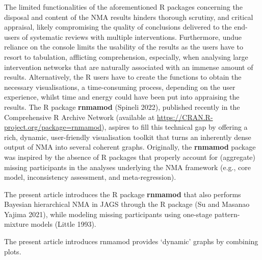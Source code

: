 The limited functionalities of the aforementioned R packages concerning the disposal
and content of the NMA results hinders thorough scrutiny, and critical appraisal,
likely compromising the quality of conclusions delivered to the end-users of
systematic reviews with multiple interventions. Furthermore, undue reliance on the
console limits the usability of the results as the users have to resort to tabulation,
afflicting comprehension, especially, when analysing large intervention networks
that are naturally associated with an immense amount of results. Alternatively,
the R users have to create the functions to obtain the necessary visualisations,
a time-consuming process, depending on the user experience, whilst time and energy
could have been put into appraising the results. The R package \textbf{rnmamod}
(Spineli 2022), published recently in the Comprehensive R Archive Network (available
at \url{https://CRAN.R-project.org/package=rnmamod}),
aspires to fill this technical gap by offering a rich, dynamic, user-friendly
visualisation toolkit that turns an inherently dense output of NMA into several
coherent graphs. Originally, the \textbf{rnmamod} package was inspired by the absence of
R packages that properly account for (aggregate) missing participants in the analyses
underlying the NMA framework (e.g., core model, inconsistency assessment, and
meta-regression).

The present article introduces the R package \textbf{rnmamod} that also performs
Bayesian hierarchical NMA in JAGS through the R package  (Su and Masanao Yajima 2021),
while modeling missing participants using one-stage pattern-mixture models (Little 1993).

The present article introduces rnmamod provides `dynamic' graphs by combining plots.

